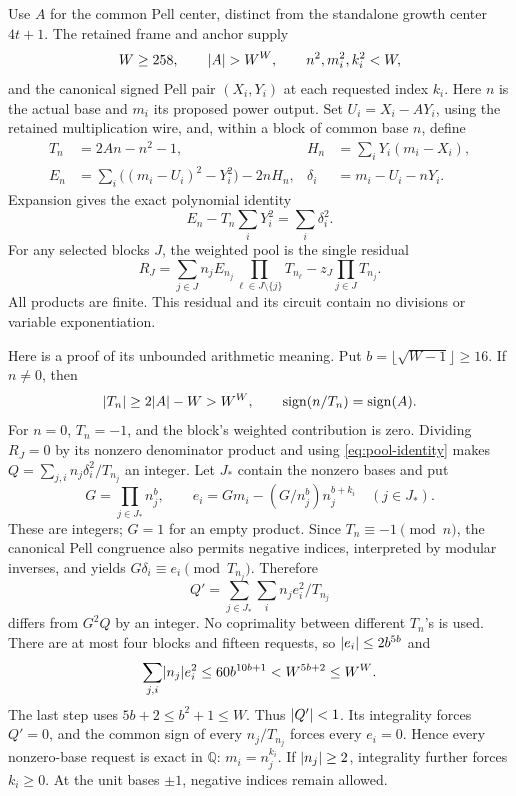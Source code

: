 Use \(A\) for the common Pell center, distinct from the standalone growth
center \(4t+1\). The retained frame and anchor supply
\[
 W\ge258,\qquad \lvert A\rvert>W^W,\qquad
 n^2,m_i^2,k_i^2<W,
\]
and the canonical signed Pell pair \((X_i,Y_i)\) at each requested index
\(k_i\). Here \(n\) is the actual base and \(m_i\) its proposed power
output. Set \(U_i=X_i-AY_i\), using the retained multiplication wire,
and, within a block of common base \(n\), define
\begin{align}
 T_n&=2An-n^2-1,&
 H_n&=\sum_iY_i(m_i-X_i),\label{eq:pool-T-H}\\
 E_n&=\sum_i\bigl((m_i-U_i)^2-Y_i^2\bigr)-2nH_n,&
 \delta_i&=m_i-U_i-nY_i.\label{eq:pool-E}
\end{align}
Expansion gives the exact polynomial identity
\begin{equation}\label{eq:pool-identity}
 E_n-T_n\sum_iY_i^2=\sum_i\delta_i^2.
\end{equation}
For any selected blocks \(J\), the weighted pool is the single residual
\begin{equation}\label{eq:weighted-pool}
 R_J=\sum_{j\in J}n_jE_{n_j}
              \prod_{\ell\in J\setminus\{j\}}T_{n_\ell}
       -z_J\prod_{j\in J}T_{n_j}.
\end{equation}
All products are finite. This residual and its circuit contain no divisions
or variable exponentiation.

Here is a proof of its unbounded arithmetic meaning. Put
\(b=\lfloor\sqrt{W-1}\rfloor\ge16\). If \(n\ne0\), then
\[
 \lvert T_n\rvert\ge2\lvert A\rvert-W>W^W,\qquad
 \operatorname{sign}(n/T_n)=\operatorname{sign}(A).
\]
For \(n=0\), \(T_n=-1\), and the block's weighted contribution is
zero. Dividing \(R_J=0\) by its nonzero denominator product and using
\eqref{eq:pool-identity} makes
\(Q=\sum_{j,i}n_j\delta_i^2/T_{n_j}\) an integer.
Let \(J_*\) contain the nonzero bases and put
\[
 G=\prod_{j\in J_*}n_j^b,\qquad
 e_i=Gm_i-(G/n_j^b)n_j^{b+k_i}\quad(j\in J_*).
\]
These are integers; \(G=1\) for an empty product. Since
\(T_n\equiv-1\pmod n\), the canonical Pell congruence also permits
negative indices, interpreted by modular inverses, and yields
\(G\delta_i\equiv e_i\pmod{T_{n_j}}\). Therefore
\[
 Q'=\sum_{j\in J_*}\sum_i n_je_i^2/T_{n_j}
\]
differs from \(G^2Q\) by an integer. No coprimality between different
\(T_n\)'s is used. There are at most four blocks and fifteen requests,
so \(\lvert e_i\rvert\le2b^{5b}\) and
\[
 \sum_{j,i}\lvert n_j\rvert e_i^2
 \le60b^{10b+1}<W^{5b+2}\le W^W.
\]
The last step uses \(5b+2\le b^2+1\le W\). Thus \(\lvert Q'\rvert<1\).
Its integrality forces \(Q'=0\), and the common sign of every
\(n_j/T_{n_j}\) forces every \(e_i=0\). Hence every nonzero-base
request is exact in \(\mathbb Q\): \(m_i=n_j^{k_i}\). If
\(\lvert n_j\rvert\ge2\), integrality further forces \(k_i\ge0\).
At the unit bases \(\pm1\), negative indices remain allowed.


